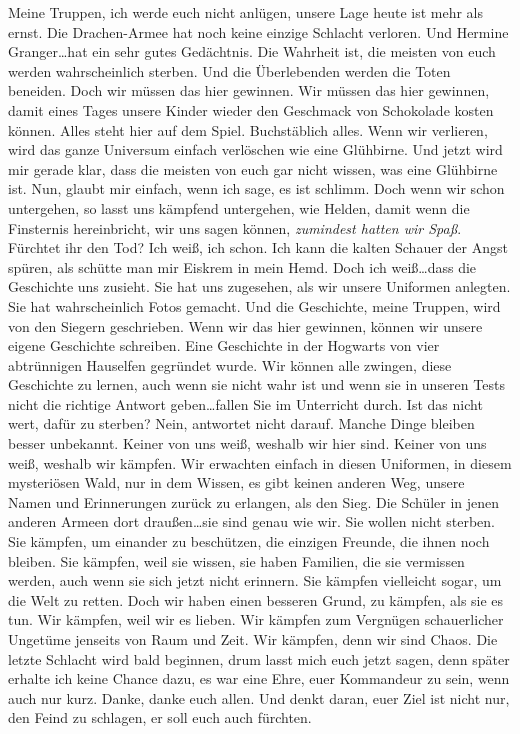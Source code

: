 Meine Truppen, ich werde euch nicht anlügen, unsere Lage heute ist mehr als ernst. Die Drachen-Armee hat noch keine einzige Schlacht verloren. Und Hermine Granger…hat ein sehr gutes Gedächtnis. Die Wahrheit ist, die meisten von euch werden wahrscheinlich sterben. Und die Überlebenden werden die Toten beneiden. Doch wir müssen das hier gewinnen. Wir müssen das hier gewinnen, damit eines Tages unsere Kinder wieder den Geschmack von Schokolade kosten können. Alles steht hier auf dem Spiel. Buchstäblich alles. Wenn wir verlieren, wird das ganze Universum einfach verlöschen wie eine Glühbirne. Und jetzt wird mir gerade klar, dass die meisten von euch gar nicht wissen, was eine Glühbirne ist. Nun, glaubt mir einfach, wenn ich sage, es ist schlimm. Doch wenn wir schon untergehen, so lasst uns kämpfend untergehen, wie Helden, damit wenn die Finsternis hereinbricht, wir uns sagen können, \emph{zumindest hatten wir Spaß}. Fürchtet ihr den Tod? Ich weiß, ich schon. Ich kann die kalten Schauer der Angst spüren, als schütte man mir Eiskrem in mein Hemd. Doch ich weiß…dass die Geschichte uns zusieht. Sie hat uns zugesehen, als wir unsere Uniformen anlegten. Sie hat wahrscheinlich Fotos gemacht. Und die Geschichte, meine Truppen, wird von den Siegern geschrieben. Wenn wir das hier gewinnen, können wir unsere eigene Geschichte schreiben. Eine Geschichte in der Hogwarts von vier abtrünnigen Hauselfen gegründet wurde. Wir können alle zwingen, diese Geschichte zu lernen, auch wenn sie nicht wahr ist und wenn sie in unseren Tests nicht die richtige Antwort geben…fallen Sie im Unterricht durch. Ist das nicht wert, dafür zu sterben? Nein, antwortet nicht darauf. Manche Dinge bleiben besser unbekannt. Keiner von uns weiß, weshalb wir hier sind. Keiner von uns weiß, weshalb wir kämpfen. Wir erwachten einfach in diesen Uniformen, in diesem mysteriösen Wald, nur in dem Wissen, es gibt keinen anderen Weg, unsere Namen und Erinnerungen zurück zu erlangen, als den Sieg. Die Schüler in jenen anderen Armeen dort draußen…sie sind genau wie wir. Sie wollen nicht sterben. Sie kämpfen, um einander zu beschützen, die einzigen Freunde, die ihnen noch bleiben. Sie kämpfen, weil sie wissen, sie haben Familien, die sie vermissen werden, auch wenn sie sich jetzt nicht erinnern. Sie kämpfen vielleicht sogar, um die Welt zu retten. Doch wir haben einen besseren Grund, zu kämpfen, als sie es tun. Wir kämpfen, weil wir es lieben. Wir kämpfen zum Vergnügen schauerlicher Ungetüme jenseits von Raum und Zeit. Wir kämpfen, denn wir sind Chaos. Die letzte Schlacht wird bald beginnen, drum lasst mich euch jetzt sagen, denn später erhalte ich keine Chance dazu, es war eine Ehre, euer Kommandeur zu sein, wenn auch nur kurz. Danke, danke euch allen. Und denkt daran, euer Ziel ist nicht nur, den Feind zu schlagen, er soll euch auch fürchten.

